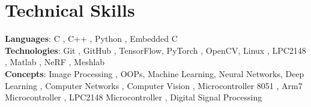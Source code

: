 \section{Technical Skills}
    \begin{itemize}[leftmargin=0.15in, label={}]
	\small{\item{
		\textbf{Languages}{: C , C++ , Python , Embedded C } \\
		\textbf{Technologies}{: Git , GitHub , TensorFlow, PyTorch , OpenCV, Linux , LPC2148 , Matlab , NeRF , Meshlab } \\
		\textbf{Concepts}{: Image Processing , OOPs, Machine Learning, Neural Networks, Deep Learning , Computer Networks , Computer Vision , Microcontroller 8051 , Arm7 Microcontroller , LPC2148 Microcontroller , Digital Signal Processing}
	}}
    \end{itemize}